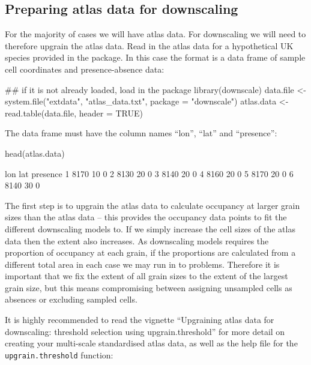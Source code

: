 \documentclass{article}[12pt, a4paper]
\begin{document}
\subsection{Preparing atlas data for downscaling}
For the majority of cases we will have atlas data. For downscaling we will need to therefore upgrain the atlas data. Read in the atlas data for a hypothetical UK species provided in the package. In this case the format is a data frame of sample cell coordinates and presence-absence data:

\begin{Schunk}
\begin{Sinput}
## if it is not already loaded, load in the package
library(downscale)
data.file <- system.file("extdata", "atlas_data.txt", package = "downscale")
atlas.data <- read.table(data.file, header = TRUE)
\end{Sinput}
\end{Schunk}

The data frame must have the column names “lon”, “lat” and “presence”:

\begin{Schunk}
\begin{Sinput}
head(atlas.data)
\end{Sinput}
\begin{Soutput}
   lon lat presence
1 8170  10        0
2 8130  20        0
3 8140  20        0
4 8160  20        0
5 8170  20        0
6 8140  30        0
\end{Soutput}
\end{Schunk}

The first step is to upgrain the atlas data to calculate occupancy at larger grain sizes than the atlas data – this provides the occupancy data points to fit the different downscaling models to. If we simply increase the cell sizes of the atlas data then the extent also increases. As downscaling models requires the proportion of occupancy at each grain, if the proportions are calculated from a different total area in each case we may run in to problems. Therefore it is important that we fix the extent of all grain sizes to the extent of the largest grain size, but this means compromising between assigning unsampled cells as absences or excluding sampled cells.

It is highly recommended to read the vignette “Upgraining atlas data for downscaling: threshold selection using upgrain.threshold” for more detail on creating your multi-scale standardised atlas data, as well as the help file for the \texttt{upgrain.threshold} function:
\end{document}

